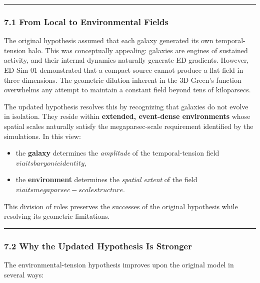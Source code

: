 \begin{center}\rule{0.5\linewidth}{0.5pt}\end{center}

\subsubsection{7.1 From Local to Environmental
Fields}\label{from-local-to-environmental-fields}

The original hypothesis assumed that each galaxy generated its own
temporal-tension halo. This was conceptually appealing: galaxies are
engines of sustained activity, and their internal dynamics naturally
generate ED gradients. However, ED-Sim-01 demonstrated that a compact
source cannot produce a flat field in three dimensions. The geometric
dilution inherent in the 3D Green's function overwhelms any attempt to
maintain a constant field beyond tens of kiloparsecs.

The updated hypothesis resolves this by recognizing that galaxies do not
evolve in isolation. They reside within \textbf{extended, event-dense
environments} whose spatial scales naturally satisfy the
megaparsec-scale requirement identified by the simulations. In this
view:

\begin{itemize}
\tightlist
\item
  the \textbf{galaxy} determines the \emph{amplitude} of the
  temporal-tension field \(via its baryonic identity\),\\
\item
  the \textbf{environment} determines the \emph{spatial extent} of the
  field \(via its megaparsec-scale structure\).
\end{itemize}

This division of roles preserves the successes of the original
hypothesis while resolving its geometric limitations.

\begin{center}\rule{0.5\linewidth}{0.5pt}\end{center}

\subsubsection{7.2 Why the Updated Hypothesis Is
Stronger}\label{why-the-updated-hypothesis-is-stronger}

The environmental-tension hypothesis improves upon the original model in
several ways:

